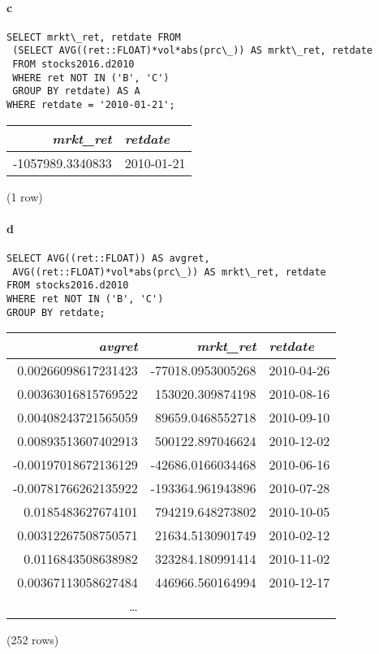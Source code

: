 \documentclass[]{article}
\let\oldparagraph\paragraph
\renewcommand{\paragraph}[1]{\oldparagraph{#1}\mbox{}}
\begin{document}
\paragraph{c}

\color{blue}
\begin{verbatim}
SELECT mrkt\_ret, retdate FROM
 (SELECT AVG((ret::FLOAT)*vol*abs(prc\_)) AS mrkt\_ret, retdate
 FROM stocks2016.d2010
 WHERE ret NOT IN ('B', 'C')
 GROUP BY retdate) AS A
WHERE retdate = '2010-01-21';
\end{verbatim}
\color{black}

\begin{center}
\begin{tabular}{r | l}
\textit{mrkt\_ret} & \textit{retdate} \\
\hline
-1057989.3340833 & 2010-01-21 \\
\end{tabular}

\noindent (1 row) \\
\end{center}

\paragraph{d}

\color{blue}
\begin{verbatim}
SELECT AVG((ret::FLOAT)) AS avgret,
 AVG((ret::FLOAT)*vol*abs(prc\_)) AS mrkt\_ret, retdate
FROM stocks2016.d2010
WHERE ret NOT IN ('B', 'C')
GROUP BY retdate;
\end{verbatim}
\color{black}

\begin{center}
\begin{tabular}{r | r | l}
\textit{avgret} & \textit{mrkt\_ret} & \textit{retdate} \\
\hline
0.00266098617231423 & -77018.0953005268 & 2010-04-26 \\
0.00363016815769522 & 153020.309874198 & 2010-08-16 \\
0.00408243721565059 & 89659.0468552718 & 2010-09-10 \\
0.00893513607402913 & 500122.897046624 & 2010-12-02 \\
-0.00197018672136129 & -42686.0166034468 & 2010-06-16 \\
-0.00781766262135922 & -193364.961943896 & 2010-07-28 \\
0.0185483627674101 & 794219.648273802 & 2010-10-05 \\
0.00312267508750571 & 21634.5130901749 & 2010-02-12 \\
0.0116843508638982 & 323284.180991414 & 2010-11-02 \\
0.00367113058627484 & 446966.560164994 & 2010-12-17 \\
\ldots\\
\end{tabular}

\noindent (252 rows) \\
\end{center}
\end{document}
